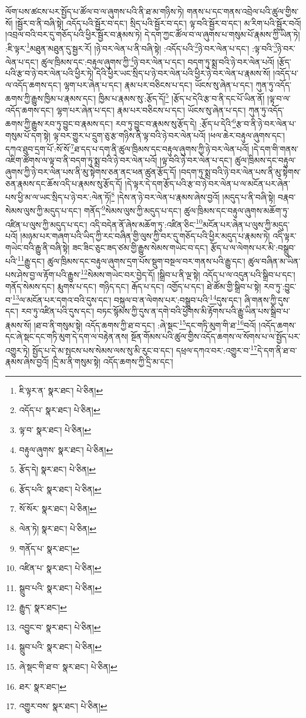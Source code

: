 ལོག་པས་ཚངས་པར་སྤྱོད་པ་ཚོལ་བ་ལ་ཞུགས་པའི་ནི་ཐ་མ་གཉིས་ཏེ། གནས་པ་དང་གནས་འབྲེལ་པའི་ཚུལ་གྱིས་སོ། །སྦྱོར་བ་ནི་བཞི་སྟེ། འདོད་པའི་སྦྱོར་བ་དང་། སྲིད་པའི་སྦྱོར་བ་དང་། ལྟ་བའི་སྦྱོར་བ་དང་། མ་རིག་པའི་སྦྱོར་བའོ། །འབྲལ་བའི་བར་དུ་གཅོད་པའི་ཕྱིར་སྦྱོར་བ་རྣམས་ཏེ། དེ་དག་ཀྱང་ཚོལ་བ་ལ་ཞུགས་པ་གསུམ་པོ་རྣམས་ཀྱི་ཡིན་ཏེ། :ཇི་ལྟར་\footnote{ཇི་ལྟར་ན་  སྣར་ཐང་།  པེ་ཅིན། }མཐུན་མཐུན་དུ་སྦྱར་རོ། །ཉེ་བར་ལེན་པ་ནི་བཞི་སྟེ། :འདོད་པའི་\footnote{འདོད་པ་  སྣར་ཐང་།  པེ་ཅིན། }ཉེ་བར་ལེན་པ་དང་། :ལྟ་བའི་\footnote{ལྟ་བ་  སྣར་ཐང་།  པེ་ཅིན། }ཉེ་བར་ལེན་པ་དང་། ཚུལ་ཁྲིམས་དང་:བརྟུལ་ཞུགས་ཀྱི་\footnote{བརྟུལ་ཞུགས་  སྣར་ཐང་།  པེ་ཅིན། }ཉེ་བར་ལེན་པ་དང་། བདག་ཏུ་སྨྲ་བའི་ཉེ་བར་ལེན་པའོ། །རྩོད་པའི་རྩ་བ་ཉེ་བར་ལེན་པའི་ཕྱིར་ཏེ། དེའི་ཕྱིར་ཡང་སྲིད་པ་ཉེ་བར་ལེན་པའི་ཕྱིར་ཉེ་བར་ལེན་པ་རྣམས་སོ། །འདོད་པ་ལ་འདོད་ཆགས་དང་། ལྷག་པར་ཞེན་པ་དང་། རྣམ་པར་བཅིངས་པ་དང་། ཡོངས་སུ་ཞེན་པ་དང་། ཀུན་ཏུ་འདོད་ཆགས་ཀྱི་རྒྱུས་ཁྱིམ་པ་རྣམས་དང་། ཁྱིམ་པ་རྣམས་སུ་:རྩོད་དོ།\footnote{རྩོད་དེ།  སྣར་ཐང་།  པེ་ཅིན། } །རྩོད་པ་དེའི་རྩ་བ་ནི་དང་པོ་ཡིན་ནོ། །ལྟ་བ་ལ་འདོད་ཆགས་དང་། ལྷག་པར་ཞེན་པ་དང་། རྣམ་པར་བཅིངས་པ་དང་། ཡོངས་སུ་ཞེན་པ་དང་། ཀུན་ཏུ་འདོད་ཆགས་ཀྱི་རྒྱུས་རབ་ཏུ་བྱུང་བ་རྣམས་དང་། རབ་ཏུ་བྱུང་བ་རྣམས་སུ་རྩོད་དེ། :རྩོད་པ་དེའི་\footnote{རྩོད་པའི་  སྣར་ཐང་།  པེ་ཅིན། }རྩ་བ་ནི་ཉེ་བར་ལེན་པ་གསུམ་པོ་དག་སྟེ། ལྟ་བར་གྱུར་པ་དྲུག་ཅུ་རྩ་གཉིས་ནི་ལྟ་བའི་ཉེ་བར་ལེན་པའོ། །ཕལ་ཆེར་བརྟུལ་ཞུགས་དང་། དཀའ་ཐུབ་དྲག་པོ་:སོ་སོ་\footnote{སོ་སོར་  སྣར་ཐང་།  པེ་ཅིན། }ཐ་དད་པ་དག་ནི་ཚུལ་ཁྲིམས་དང་བརྟུལ་ཞུགས་ཀྱི་ཉེ་བར་ལེན་པའོ། །དེ་དག་གི་གནས་འཇིག་ཚོགས་ལ་ལྟ་བ་ནི་བདག་ཏུ་སྨྲ་བའི་ཉེ་བར་ལེན་པའོ། །ལྟ་བའི་ཉེ་བར་ལེན་པ་དང་། ཚུལ་ཁྲིམས་དང་བརྟུལ་ཞུགས་ཀྱི་ཉེ་བར་ལེན་པས་ནི་མུ་སྟེགས་ཅན་ནང་ཕན་ཚུན་རྩོད་དོ། །བདག་ཏུ་སྨྲ་བའི་ཉེ་བར་ལེན་པས་ནི་མུ་སྟེགས་ཅན་རྣམས་དང་ཆོས་འདི་པ་རྣམས་སུ་རྩོད་དོ། །དེ་ལྟར་དེ་དག་རྩོད་པའི་རྩ་བ་ཉེ་བར་ལེན་པ་ལ་མངོན་པར་ཞེན་པས་ཕྱི་མ་ལ་ཡང་སྲིད་པ་ཉེ་བར་:ལེན་ཏོ།\footnote{ལེན་ཏེ།  སྣར་ཐང་།  པེ་ཅིན། } །དེས་ན་ཉེ་བར་ལེན་པ་རྣམས་ཞེས་བྱའོ། །མདུད་པ་ནི་བཞི་སྟེ། བརྣབ་སེམས་ལུས་ཀྱི་མདུད་པ་དང་། གནོད་\footnote{གནོད་པ་  སྣར་ཐང་། }སེམས་ལུས་ཀྱི་མདུད་པ་དང་། ཚུལ་ཁྲིམས་དང་བརྟུལ་ཞུགས་མཆོག་ཏུ་འཛིན་པ་ལུས་ཀྱི་མདུད་པ་དང་། འདི་བདེན་ནོ་ཞེས་མཆོག་ཏུ་:འཛིན་ཅིང་\footnote{འཛིན་པ་  སྣར་ཐང་།  པེ་ཅིན། }མངོན་པར་ཞེན་པ་ལུས་ཀྱི་མདུད་པའོ། །མཉམ་པར་གཞག་པའི་ཡིད་ཀྱི་རང་བཞིན་གྱི་ལུས་ཀྱི་བར་དུ་གཅོད་པའི་ཕྱིར་མདུད་པ་རྣམས་ཏེ། འདི་ལྟར་གཡེང་བའི་རྒྱུ་ནི་བཞི་སྟེ། ཟང་ཟིང་ཅུང་ཟད་ཙམ་གྱི་རྒྱུས་སེམས་གཡེང་བ་དང་། རྩོད་པ་ལ་ལེགས་པར་མི་:བསྒྲུབ་པའི་\footnote{སྒྲུབ་པའི་  སྣར་ཐང་།  པེ་ཅིན། }རྒྱུ་དང་། ཚུལ་ཁྲིམས་དང་བརྟུལ་ཞུགས་དྲག་པོས་སྡུག་བསྔལ་བར་གནས་པའི་རྒྱུ་དང་། ཚུལ་བཞིན་མ་ཡིན་པས་ཤེས་བྱ་ལ་རྟོག་པའི་རྒྱུས་\footnote{རྒྱུད་  སྣར་ཐང་། }སེམས་གཡེང་བར་བྱེད་དོ། །སྒྲིབ་པ་ནི་ལྔ་སྟེ། འདོད་པ་ལ་འདུན་པའི་སྒྲིབ་པ་དང་། གནོད་སེམས་དང་། རྨུགས་པ་དང་། གཉིད་དང་། རྒོད་པ་དང་། འགྱོད་པ་དང་། ཐེ་ཚོམ་གྱི་སྒྲིབ་པ་སྟེ། རབ་ཏུ་:བྱུང་བ་\footnote{འབྱུང་བ་  སྣར་ཐང་།  པེ་ཅིན། }ལ་མངོན་པར་དགའ་བའི་དུས་དང་། བསྐུལ་བ་ན་ལེགས་པར་:བསྒྲུབ་པའི་\footnote{སྒྲུབ་པའི་  སྣར་ཐང་།  པེ་ཅིན། }དུས་དང་། ཞི་གནས་ཀྱི་དུས་དང་། རབ་ཏུ་འཛིན་པའི་དུས་དང་། བཏང་སྙོམས་ཀྱི་དུས་ན་དགེ་བའི་ཕྱོགས་མི་རྟོགས་པའི་རྒྱུ་ཡིན་པས་སྒྲིབ་པ་རྣམས་སོ། །ཐ་བ་ནི་གསུམ་སྟེ། འདོད་ཆགས་ཀྱི་ཐ་བ་དང་། :ཞེ་སྡང་\footnote{ཞེ་སྡང་གི་ཐ་བ་  སྣར་ཐང་།  པེ་ཅིན། }དང་གཏི་མུག་གི་ཐ་\footnote{ཐར་  སྣར་ཐང་། }བའོ། །འདོད་ཆགས་དང་ཞེ་སྡང་དང་གཏི་མུག་དེ་དག་ལ་བརྟེན་ནས། སྔོན་གོམས་པའི་ཚུལ་གྱིས་འདོད་ཆགས་ལ་སོགས་པ་ལ་སྤྱོད་པར་འགྱུར་ཏེ། སྤྱོད་པ་དེ་མ་སྤངས་པས་སེམས་ལས་སུ་མི་རུང་བ་དང་། དཕྲལ་དཀའ་བར་:འགྱུར་བ་\footnote{འགྱུར་བས་  སྣར་ཐང་།  པེ་ཅིན། }དེ་དག་ནི་ཐ་བ་རྣམས་ཞེས་བྱའོ། །དྲི་མ་ནི་གསུམ་སྟེ། འདོད་ཆགས་ཀྱི་དྲི་མ་དང་། 